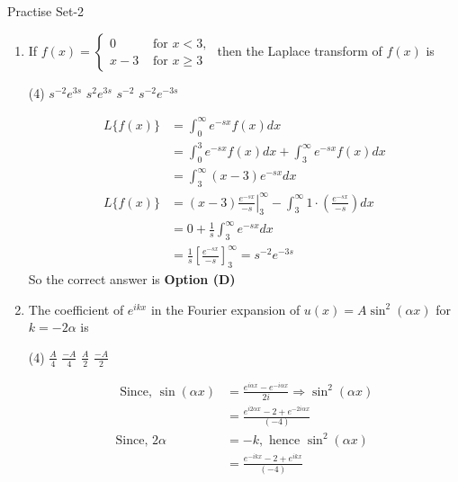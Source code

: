 \newpage
\begin{abox}
	Practise Set-2
\end{abox}
\begin{enumerate}[label=\color{ocre}\textbf{\arabic*.}]
	\item If $f(x)=\left\{\begin{array}{ll}0 & \text { for } x<3, \\ x-3 & \text { for } x \geq 3\end{array}\right.$ then the Laplace transform of $f(x)$ is
	{}
	\begin{tasks}(4)
		\task[\textbf{A.}] $s^{-2} e^{3 s}$
		\task[\textbf{B.}] $s^{2} e^{3 s}$
		\task[\textbf{C.}] $s^{-2}$
		\task[\textbf{D.}] $s^{-2} e^{-3 s}$
	\end{tasks}
	\begin{answer}
		\begin{align*}
		L\{f(x)\}&=\int_{0}^{\infty} e^{-s x} f(x) d x\\&=\int_{0}^{3} e^{-s x} f(x) d x+\int_{3}^{\infty} e^{-s x} f(x) d x\\&=\int_{3}^{\infty}(x-3) e^{-s x} d x\\
		L\{f(x)\}&=\left.(x-3) \frac{e^{-s x}}{-s}\right|_{3} ^{\infty}-\int_{3}^{\infty} 1 \cdot\left(\frac{e^{-s x}}{-s}\right) d x\\&=0+\frac{1}{s} \int_{3}^{\infty} e^{-s x} d x\\&=\frac{1}{s}\left[\frac{e^{-s x}}{-s}\right]_{3}^{\infty}=s^{-2} e^{-3 s}
		\end{align*}
		So the correct answer is \textbf{Option (D)}
	\end{answer}
	\item The coefficient of $e^{i k x}$ in the Fourier expansion of $u(x)=A \sin ^{2}(\alpha x)$ for $k=-2 \alpha$ is
	{}
	\begin{tasks}(4)
		\task[\textbf{A.}] $\frac{A}{4}$
		\task[\textbf{B.}] $\frac{-A}{4}$
		\task[\textbf{C.}] $\frac{A}{2}$
		\task[\textbf{D.}] $\frac{-A}{2}$
	\end{tasks}
	\begin{answer}
		\begin{align*}
		\text{	Since, }\sin (\alpha x)&=\frac{e^{i \alpha x}-e^{-i \alpha x}}{2 i} \Rightarrow \sin ^{2}(\alpha x)\\&=\frac{e^{i 2 \alpha x}-2+e^{-2 i \alpha x}}{(-4)}\\
		\text{Since, }2 \alpha&=-k,\text{ hence }\sin ^{2}(\alpha x)\\&=\frac{e^{-i k x}-2+e^{i k x}}{(-4)}\\

\end{align*}
\end{answer}
\end{enumerate}
